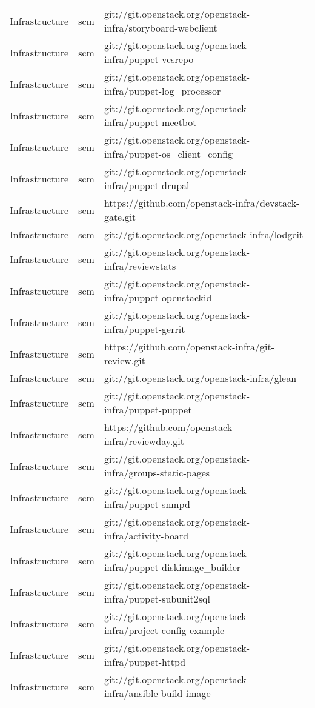 \begin{center}
\begin{longtable}{|p{4cm}|p{1cm}|p{10cm}|}
Infrastructure&scm&git://git.openstack.org/openstack-infra/storyboard-webclient\\ 
Infrastructure&scm&git://git.openstack.org/openstack-infra/puppet-vcsrepo\\ 
Infrastructure&scm&git://git.openstack.org/openstack-infra/puppet-log\_processor\\ 
Infrastructure&scm&git://git.openstack.org/openstack-infra/puppet-meetbot\\ 
Infrastructure&scm&git://git.openstack.org/openstack-infra/puppet-os\_client\_config\\ 
Infrastructure&scm&git://git.openstack.org/openstack-infra/puppet-drupal\\ 
Infrastructure&scm&https://github.com/openstack-infra/devstack-gate.git\\ 
Infrastructure&scm&git://git.openstack.org/openstack-infra/lodgeit\\ 
Infrastructure&scm&git://git.openstack.org/openstack-infra/reviewstats\\ 
Infrastructure&scm&git://git.openstack.org/openstack-infra/puppet-openstackid\\ 
Infrastructure&scm&git://git.openstack.org/openstack-infra/puppet-gerrit\\ 
Infrastructure&scm&https://github.com/openstack-infra/git-review.git\\ 
Infrastructure&scm&git://git.openstack.org/openstack-infra/glean\\ 
Infrastructure&scm&git://git.openstack.org/openstack-infra/puppet-puppet\\ 
Infrastructure&scm&https://github.com/openstack-infra/reviewday.git\\ 
Infrastructure&scm&git://git.openstack.org/openstack-infra/groups-static-pages\\ 
Infrastructure&scm&git://git.openstack.org/openstack-infra/puppet-snmpd\\ 
Infrastructure&scm&git://git.openstack.org/openstack-infra/activity-board\\ 
Infrastructure&scm&git://git.openstack.org/openstack-infra/puppet-diskimage\_builder\\ 
Infrastructure&scm&git://git.openstack.org/openstack-infra/puppet-subunit2sql\\ 
Infrastructure&scm&git://git.openstack.org/openstack-infra/project-config-example\\ 
Infrastructure&scm&git://git.openstack.org/openstack-infra/puppet-httpd\\ 
Infrastructure&scm&git://git.openstack.org/openstack-infra/ansible-build-image\\ 

\end{longtable}
\end{center}
